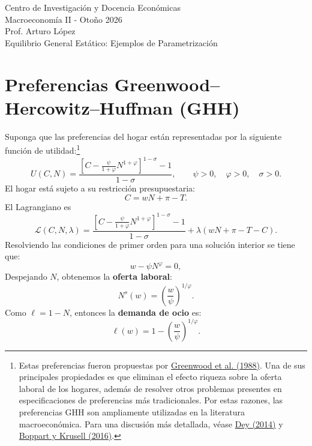 \documentclass[11pt]{article}
\begin{document}
\begin{center}
    {\Large Centro de Investigación y Docencia Económicas \\[0.3em] \large Macroeconomía II - Otoño 2026 \\[0.3em]
    Prof. Arturo López}\\[0.3em]
    {\large Equilibrio General Estático: Ejemplos de Parametrización}
\end{center}

\vspace{1em}

\tableofcontents

\newpage

\section{Preferencias Greenwood--Hercowitz--Huffman (GHH)}

Suponga que las preferencias del hogar están representadas por la siguiente función de utilidad:\footnote{Estas preferencias fueron propuestas por \href{https://www.jstor.org/stable/1809141}{Greenwood et al. (1988)}. Una de sus principales propiedades es que eliminan el efecto riqueza sobre la oferta laboral de los hogares, además de resolver otros problemas presentes en especificaciones de preferencias más tradicionales. Por estas razones, las preferencias GHH son ampliamente utilizadas en la literatura macroeconómica. Para una discusión más detallada, véase \href{https://www.sciencedirect.com/science/article/abs/pii/S0165188913001991}{Dey (2014)} y \href{https://www.nber.org/system/files/working_papers/w22215/w22215.pdf}{Boppart y Krusell (2016)}.}
\[
U(C,N)
=
\frac{
\left[
C-\frac{\psi}{1+\varphi}N^{1+\varphi}
\right]^{1-\sigma}-1
}{
1-\sigma
},
\qquad
\psi>0,\quad \varphi>0,\quad \sigma>0.
\]
El hogar está sujeto a su restricción presupuestaria:
\[
C=wN+\pi-T.
\]
El Lagrangiano es
\[
\mathcal{L}(C,N, \lambda)
=
\frac{
\left[
C-\frac{\psi}{1+\varphi}N^{1+\varphi}
\right]^{1-\sigma}-1
}{
1-\sigma
}
+
\lambda
\left(
wN+\pi-T - C
\right).
\]
Resolviendo las condiciones de primer orden para una solución interior se tiene que:
\[
w-\psi N^\varphi=0,
\]
Despejando $N$, obtenemos la \textbf{oferta laboral}:
\[
\boxed{
N^s(w)
=
\left(\frac{w}{\psi}\right)^{1/\varphi}
}.
\]
Como $\ell=1-N$, entonces la \textbf{demanda de ocio} es:
\[
\boxed{
\ell(w)
=
1-\left(\frac{w}{\psi}\right)^{1/\varphi}
}.
\]
\end{document}

